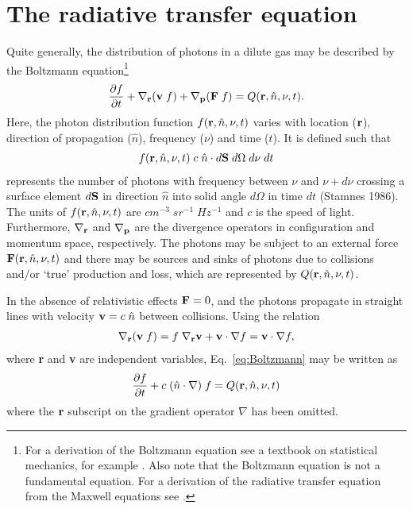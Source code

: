 \section{The radiative transfer equation}
Quite generally, the distribution of photons in a dilute gas may be
described by the Boltzmann equation\footnote{For a derivation of the
  Boltzmann equation see a textbook on statistical mechanics, for
  example \citet{Reif1965}. Also note that the Boltzmann equation is
  not a fundamental equation. For a derivation of the radiative
  transfer equation from the Maxwell equations see
  \citet{Mishchenko2002}.} 
\begin{eqnarray}
  {\frac{\partial f}{\partial t}} + \nabla_{{\bf r}}({\bf v}\; f ) +
  \nabla_{{\bf p}}({\bf F} \;f ) = Q({\bf r},\hat{n}, \nu, t).
  \label{eq:Boltzmann}
\end{eqnarray}
Here, the photon distribution function $f({\bf r},\hat{n}, \nu,  t)$ 
varies with location (${\bf r}$), direction of propagation
($\hat{n}$), frequency ($\nu$) and time ($t$). It is defined such that
\begin{eqnarray}
f({\bf r},\hat{n}, \nu, t)\;c\; \hat{n}\cdot d{\bf S}\;d\Omega\; d\nu\; dt
  \label{eq:photon_distribution}
\end{eqnarray}
represents the number of photons with frequency between $\nu$ and $\nu+d\nu$
crossing a surface element $d{\bf S}$ in direction $\hat{n}$ into
solid angle $d\Omega$ in time $dt$ (Stamnes 1986). 
The units of $f({\bf r},\hat{n}, \nu, t)$ are $cm^{-3}\; sr^{-1}\; Hz^{-1}$
and $c$ is the speed of light.
Furthermore, $\nabla_{{\bf r}}$ and $\nabla_{{\bf p}}$ are the divergence
operators in configuration and momentum space, respectively. The 
photons may be subject to an external force ${\bf F}({\bf r},\hat{n}, \nu, t)$
and there may be sources and sinks of photons due to collisions and/or
`true' production and loss, which are represented by 
$Q({\bf r},\hat{n}, \nu, t)$. 

In the absence of relativistic effects ${\bf F}=0$, and the photons propagate 
in straight lines with velocity ${\bf v}=c\;\hat{n}$ between
collisions. Using the relation  
\begin{eqnarray}
\nabla_{{\bf r}}({\bf v}\; f ) = f\;\nabla_{{\bf r}}{\bf v} +
{\bf v}\cdot \nabla f  = {\bf v}\cdot \nabla f,
\end{eqnarray}
where {\bf r} and {\bf v} are independent variables,
Eq.~\ref{eq:Boltzmann} may be written as  
\begin{eqnarray}
  {\partial f \over \partial t} + c\;( \hat{n}\cdot \nabla)\; f
  = Q({\bf r},\hat{n}, \nu, t)
\label{eq:Boltzmann_simpler}
\end{eqnarray}
where the ${\bf r}$ subscript on the gradient operator $\nabla$  has
been omitted. 

